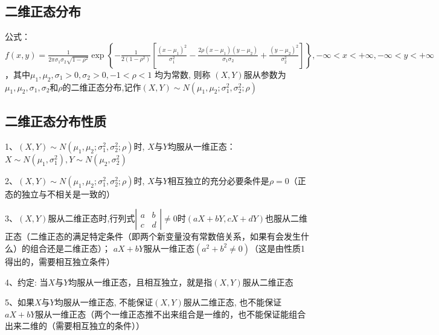 \subsection{二维正态分布}

公式：$ f(x, y)=\frac{1}{2 \pi \sigma_{1} \sigma_{2} \sqrt{1-\rho^{2}}} \exp \left\{-\frac{1}{2\left(1-\rho^{2}\right)}\left[\frac{\left(x-\mu_{1}\right)^{2}}{\sigma_{1}^{2}}-\frac{2 \rho\left(x-\mu_{1}\right)\left(y-\mu_{2}\right)}{\sigma_{1} \sigma_{2}}+\frac{\left(y-\mu_{2}\right)^{2}}{\sigma_{2}^{2}}\right]\right\},-\infty<x<+\infty,-\infty<y<+\infty $，其中$ \mu_{1}, \mu_{2}, \sigma_{1}>0, \sigma_{2}>0,-1<\rho<1 $ 均为常数, 则称 $ (X, Y)  $服从参数为$ \mu_{1}, \mu_{2}, \sigma_{1}, \sigma_{2} $和$ \rho $的二维正态分布,记作$ (X, Y) \sim N\left(\mu_{1}, \mu_{2} ; \sigma_{1}^{2}, \sigma_{2}^{2} ; \rho\right) $



\subsection{二维正态分布性质}

1、$ \left(X, Y\right) \sim N\left(\mu_{1}, \mu_{2} ; \sigma_{1}^{2}, \sigma_{2}^{2} ; \rho\right) $时, $ X $与$ Y $均服从一维正态：$ X \sim{N}\left(\mu_{1}, \sigma_{1}^{2}\right), Y \sim N\left(\mu_{2}, \sigma_{2}^{2}\right) $

2、$ (X, Y) \sim N\left(\mu_{1}, \mu_{2} ; \sigma_{1}^{2}, \sigma_{2}^{2} ; \rho\right) $时, $ X $与$ Y $相互独立的充分必要条件是$ \rho=0 $（正态的独立与不相关是一致的）

3、$ (X, Y) $服从二维正态时,行列式$ \left|\begin{array}{ll}a & b \\ c & d\end{array}\right| \neq 0 $时$ (a X+b Y, c X+d Y) $也服从二维正态（二维正态的满足特定条件（即两个新变量没有常数倍关系，如果有会发生什么）的组合还是二维正态）； $  a X+b Y $服从一维正态$ \left(a^{2}+b^{2} \neq 0\right) $（这是由性质1得出的，需要相互独立条件）

4、约定: 当$ X $与$ Y $均服从一维正态，且相互独立，就是指$ (X, Y) $服从二维正态

5、如果$ X $与$ Y $均服从一维正态, 不能保证$ (X, Y) $服从二维正态, 也不能保证$ a X+b Y $服从一维正态（两个一维正态推不出来组合是一维的，也不能保证能组合出来二维的（需要相互独立的条件））

